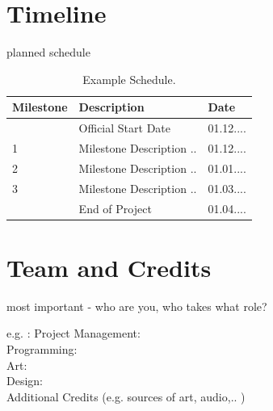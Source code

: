 \documentclass[a4paper]{scrreprt}
\begin{document}



\chapter{Timeline}

planned schedule 

\begin{table}[h]
\centering
\begin{tabular}{|l|l|l|}
\hline
Milestone & Description & Date \\\hline
& Official Start Date & 01.12.... \\
1 & Milestone Description ..  & 01.12.... \\
2 & Milestone Description ..  & 01.01.... \\
3 & Milestone Description ..  & 01.03.... \\
& End of Project & 01.04.... \\
\hline
\end{tabular}
\caption{\label{tab:schedule}Example Schedule.}
\end{table}




\chapter{Team and Credits}

most important - who are you, who takes what role? 

e.g. :
Project Management: \\
Programming: \\ 
Art: \\ 
Design: \\ 

Additional Credits (e.g. sources of art, audio,.. ) 


%
%
\end{document}
